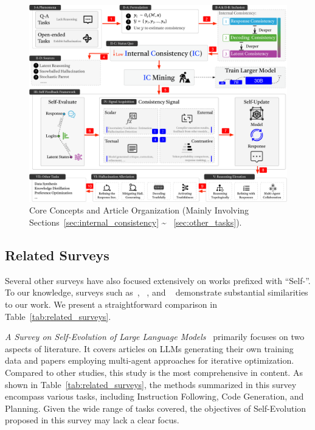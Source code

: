 \documentclass[lettersize,journal]{IEEEtran}
\begin{document}
\begin{figure}[t!]
    \centering
    \includegraphics[width=\linewidth]{figures/article_framework.pdf}
    \caption{Core Concepts and Article Organization (Mainly Involving Sections~\ref{sec:internal_consistency} \~ ~\ref{sec:other_tasks}).}
    \label{fig:article_framework}
\end{figure}


\subsection{Related Surveys}


\noindent Several other surveys have also focused extensively on works prefixed with ``Self-''. To our knowledge, surveys such as~\cite{SelfEvolution_24_arXiv_PKU}, ~\cite{SurveySelfCorrection_24_TACL_UCSB}, and ~\cite{SurveySelfCorrection_24_arXiv_PSU} demonstrate substantial similarities to our work. We present a straightforward comparison in Table~\ref{tab:related_surveys}.

\textit{A Survey on Self-Evolution of Large Language Models}~\cite{SelfEvolution_24_arXiv_PKU} primarily focuses on two aspects of literature. It covers articles on LLMs generating their own training data and papers employing multi-agent approaches for iterative optimization. Compared to other studies, this study is the most comprehensive in content. As shown in Table~\ref{tab:related_surveys}, the methods summarized in this survey encompass various tasks, including Instruction Following, Code Generation, and Planning. Given the wide range of tasks covered, the objectives of Self-Evolution proposed in this survey may lack a clear focus.
\end{document}
